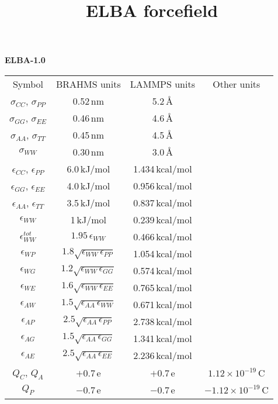 \documentclass[10pt]{article}
\title{ELBA forcefield
%
}
\date{}
\begin{document}
\large{\bf{ELBA-1.0}}
\medskip
\begin{table*}[!ht]
\begin{tabular}{|c|c|c|c|}
Symbol & BRAHMS units & LAMMPS units & Other units\\
$\sigma_{CC}$, $\sigma_{PP}$ & 0.52\,nm & 5.2\,\AA&\\
$\sigma_{GG}$, $\sigma_{EE}$ & 0.46\,nm & 4.6\,\AA&\\
$\sigma_{AA}$, $\sigma_{TT}$ & 0.45\,nm & 4.5\,\AA&\\
$\sigma_{WW}$ & 0.30\,nm & 3.0\,\AA&\\
$\epsilon_{CC}$, $\epsilon_{PP}$ & 6.0\,kJ/mol & 1.434\,kcal/mol&\\
$\epsilon_{GG}$, $\epsilon_{EE}$ & 4.0\,kJ/mol & 0.956\,kcal/mol&\\
$\epsilon_{AA}$, $\epsilon_{TT}$  & 3.5\,kJ/mol & 0.837\,kcal/mol&\\
$\epsilon_{WW}$  & 1\,kJ/mol & 0.239\,kcal/mol&\\
$\epsilon^{tot}_{WW}$  & $1.95\,\epsilon_{WW}$ & 0.466\,kcal/mol&\\
$\epsilon_{WP}$ &$1.8\sqrt{\epsilon_{WW}\,\epsilon_{PP}} $ & 1.054\,kcal/mol&\\
$\epsilon_{WG}$ & $1.2\sqrt{\epsilon_{WW}\,\epsilon_{GG}} $ & 0.574\,kcal/mol&\\
$\epsilon_{WE}$  & $1.6\sqrt{\epsilon_{WW}\,\epsilon_{EE}} $ & 0.765\,kcal/mol&\\
$\epsilon_{AW}$  & $1.5\sqrt{\epsilon_{AA}\,\epsilon_{WW}} $ & 0.671\,kcal/mol&\\
$\epsilon_{AP}$  & $2.5\sqrt{\epsilon_{AA}\,\epsilon_{PP}} $ & 2.738\,kcal/mol&\\
$\epsilon_{AG}$  & $1.5\sqrt{\epsilon_{AA}\,\epsilon_{GG}} $ & 1.341\,kcal/mol&\\
$\epsilon_{AE}$  & $2.5\sqrt{\epsilon_{AA}\,\epsilon_{EE}} $ & 2.236\,kcal/mol&\\
 $Q_C$, $Q_A$   &$+0.7$\,e &$+0.7$\,e& $1.12\times10^{-19}$\,C\\
 $Q_P$  &$-0.7$\,e & $-0.7$\,e & $-1.12\times10^{-19}$\,C\\

\end{tabular}
\end{table*}
\end{document}
